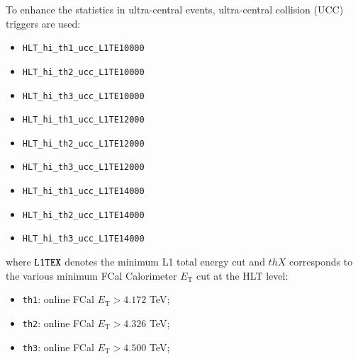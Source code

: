 To enhance the statistics in ultra-central events, ultra-central collision (UCC) triggers are used:
\begin{itemize}
\item \verb|HLT_hi_th1_ucc_L1TE10000|
\item \verb|HLT_hi_th2_ucc_L1TE10000|
\item \verb|HLT_hi_th3_ucc_L1TE10000|
\item \verb|HLT_hi_th1_ucc_L1TE12000|
\item \verb|HLT_hi_th2_ucc_L1TE12000|
\item \verb|HLT_hi_th3_ucc_L1TE12000|
\item \verb|HLT_hi_th1_ucc_L1TE14000|
\item \verb|HLT_hi_th2_ucc_L1TE14000|
\item \verb|HLT_hi_th3_ucc_L1TE14000|
\end{itemize}
where $\verb|L1TEX|$ denotes the minimum L1 total energy cut and $thX$ corresponds to the various minimum FCal Calorimeter $E_{\text{T}}$ cut at the HLT level:
\begin{itemize}
\item \verb|th1|: online FCal $E_{\text{T}}>4.172$ TeV;
\item \verb|th2|: online FCal $E_{\text{T}}>4.326$ TeV;
\item \verb|th3|: online FCal $E_{\text{T}}>4.500$ TeV;
\end{itemize}

